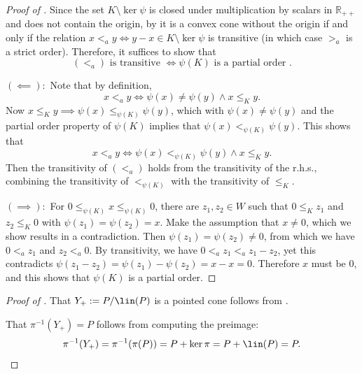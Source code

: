 \documentclass{article}
\theoremstyle{plain}
\theoremstyle{definition}
\theoremstyle{remark}
\begin{document}
\begin{proof}[\hypertarget{loc:convex_cone_mapped_with_supporting_kernel_has_a_pointed_image.proof}{}Proof of ]

Since the set $K \setminus \ker \psi$ is closed under multiplication by scalars in $\mathbb{R}_{++}$
and does not contain the origin,
by 
it is a convex cone without the origin if and only if the relation
$x <_a y  \iff y - x  \in K \setminus \ker \psi$ 
is transitive (in which case $>_a$ is a strict order).
Therefore, it suffices to show that
\begin{equation*}
(<_a) \text{ is transitive } \iff \psi(K) \text{ is a partial order }.
\end{equation*}

$(\impliedby):$
Note that by definition,
\begin{equation*}
x <_{a} y \iff \psi(x) \neq \psi(y) \land x \le_{K} y.
\end{equation*}
Now $x \leq_K y \implies \psi(x) \leq_{\psi(K)} \psi(y)$, which with $\psi(x) \neq \psi(y)$ and the partial order property of  $\psi(K)$ implies that  $\psi(x) <_{\psi(K)} \psi(y)$. This shows that
\begin{equation}
\label{eq:represent_a}
x <_{a} y \iff \psi(x) <_{\psi(K)} \psi(y) \land x \le_{K} y.
\end{equation}
Then the transitivity of $(<_a)$ holds from the transitivity of the r.h.s., 
combining the transitivity of $<_{\psi(K)}$ with the transitivity of $\leq_K$.

$(\implies):$
For $0 \leq_{\psi(K)} x \leq_{\psi(K)} 0$, there are $z_1, z_2 \in W$  such that $0 \leq_K z_1$ and $z_2 \leq_K 0$ with $\psi(z_1)=\psi(z_2)=x$. Make the assumption that $x \neq 0$, which we show results in a contradiction. Then $\psi(z_1) = \psi(z_2) \neq 0$, from which we have
$0 <_a z_1$ and $z_2 <_a 0$. By transitivity, we have $0 <_a z_1 <_a z_1 - z_2$, yet this contradicts $\psi(z_1 - z_2) = \psi(z_1)- \psi(z_2) = x-x = 0$. 
Therefore $x$ must be $0$, and this shows that $\psi(K)$ is a partial order.
\end{proof}
\begin{proof}[\hypertarget{loc:preorders_are_characterized_by_oriented_maps.proof}{}Proof of ]

That $Y_+ := P/\lin(P)$ is a pointed cone follows from .

That $\pi^{-1}(Y_+) = P$ follows from computing the preimage:
\begin{equation*}
\pi^{-1}(Y_+) = \pi^{-1}(\pi(P)) = P + \ker \pi = P + \lin(P) = P.
\end{equation*}
\end{proof}
\end{document}
